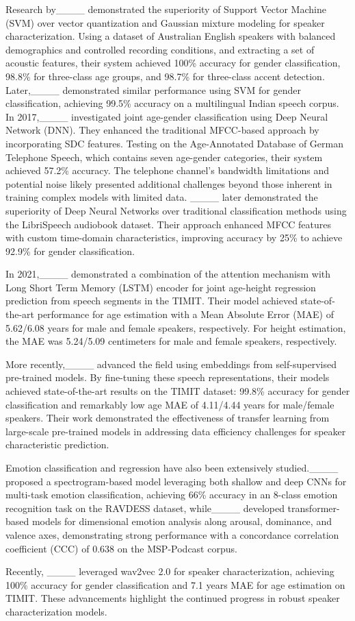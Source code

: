 Research by____ demonstrated the superiority of Support Vector Machine (SVM) over vector quantization and Gaussian mixture modeling for speaker characterization. Using a dataset of Australian English speakers with balanced demographics and controlled recording conditions, and extracting a set of acoustic features, their system achieved 100\% accuracy for gender classification, 98.8\% for three-class age groups, and 98.7\% for three-class accent detection. Later,____ demonstrated similar performance using SVM for gender classification, achieving 99.5\% accuracy on a multilingual Indian speech corpus.
In 2017,____ investigated joint age-gender classification using Deep Neural Network (DNN). They enhanced the traditional MFCC-based approach by incorporating SDC features. Testing on the Age-Annotated Database of German Telephone Speech, which contains seven age-gender categories, their system achieved 57.2\% accuracy. The telephone channel's bandwidth limitations and potential noise likely presented additional challenges beyond those inherent in training complex models with limited data.
____ later demonstrated the superiority of Deep Neural Networks over traditional classification methods using the LibriSpeech audiobook dataset. Their approach enhanced MFCC features with custom time-domain characteristics, improving accuracy by 25\% to achieve 92.9\% for gender classification. 

In 2021,____ demonstrated a combination of the attention mechanism with Long Short Term Memory (LSTM) encoder for joint age-height regression prediction from speech segments in the TIMIT. Their model achieved state-of-the-art performance for age estimation with a Mean Absolute Error (MAE) of 5.62/6.08 years for male and female speakers, respectively. For height estimation, the MAE was 5.24/5.09 centimeters for male and female speakers, respectively.

More recently,____ advanced the field using embeddings from self-supervised pre-trained models. By fine-tuning these speech representations, their models achieved state-of-the-art results on the TIMIT dataset: 99.8\% accuracy for gender classification and remarkably low age  MAE of 4.11/4.44 years for male/female speakers. Their work demonstrated the effectiveness of transfer learning from large-scale pre-trained models in addressing data efficiency challenges for speaker characteristic prediction.

Emotion classification and regression have also been extensively studied.____ proposed a spectrogram-based model leveraging both shallow and deep CNNs for multi-task emotion classification, achieving 66\% accuracy in an 8-class emotion recognition task on the RAVDESS dataset, while____ developed transformer-based models for dimensional emotion analysis along arousal, dominance, and valence axes, demonstrating strong performance with a concordance correlation coefficient (CCC) of 0.638 on the MSP-Podcast corpus.

Recently, ____ leveraged wav2vec 2.0 for speaker characterization, achieving 100\% accuracy for gender classification and 7.1 years MAE for age estimation on TIMIT. These advancements highlight the continued progress in robust speaker characterization models.